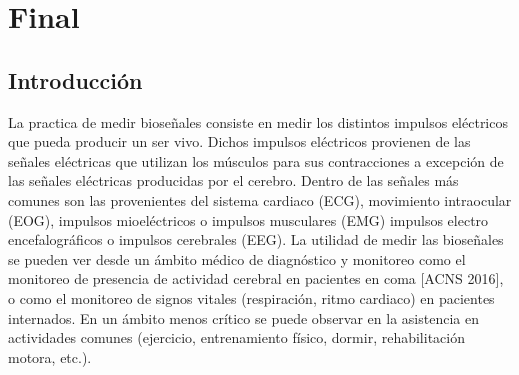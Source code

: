 
\section{Final}
\label{sec:orgd8b67db}
\subsection{Introducción}
\label{sec:orgc95a141}
La practica de medir bioseñales consiste en medir los distintos impulsos eléctricos que pueda producir un ser vivo. Dichos impulsos eléctricos provienen de las señales eléctricas que utilizan los músculos para sus contracciones a excepción de las señales eléctricas producidas por el cerebro. Dentro de las señales más comunes son las provenientes del sistema cardiaco (ECG), movimiento intraocular (EOG), impulsos mioeléctricos o impulsos musculares (EMG) impulsos electro encefalográficos o impulsos cerebrales (EEG). La utilidad de medir las bioseñales se pueden ver desde un ámbito médico de diagnóstico y monitoreo como el monitoreo de presencia de actividad cerebral en pacientes en coma [ACNS 2016], o como el monitoreo de signos vitales (respiración, ritmo cardiaco) en pacientes internados. En un ámbito menos crítico se puede observar en la asistencia en actividades comunes (ejercicio, entrenamiento físico, dormir, rehabilitación motora, etc.).

